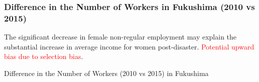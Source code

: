 \documentclass[serif, aspectratio=169]{beamer}
\begin{document}
\begin{frame}[label=numbers_of_workers]
\frametitle{Difference in the Number of Workers in Fukushima (2010 vs 2015)}

\vspace{-0.2cm}







The significant decrease in female non-regular employment may explain the substantial increase in average income for women post-disaster. \textcolor{red}{Potential upward bias due to selection bias}.

\vspace{-0.2cm}

\begin{table}[htbp]
\centering
\caption{Difference in the Number of Workers (2010 vs 2015) in Fukushima}

\vspace{-0.2cm}


\end{table}
\end{frame}
\end{document}
